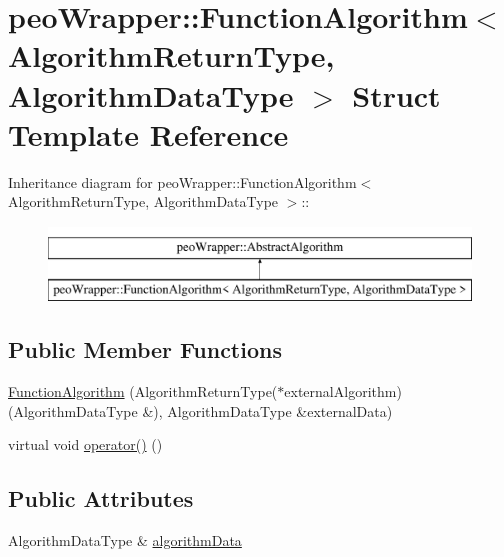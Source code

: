 \hypertarget{structpeoWrapper_1_1FunctionAlgorithm}{
\section{peo\-Wrapper::Function\-Algorithm$<$ Algorithm\-Return\-Type, Algorithm\-Data\-Type $>$ Struct Template Reference}
\label{structpeoWrapper_1_1FunctionAlgorithm}
}
Inheritance diagram for peo\-Wrapper::Function\-Algorithm$<$ Algorithm\-Return\-Type, Algorithm\-Data\-Type $>$::\begin{figure}[H]
\begin{center}
\leavevmode
\includegraphics[height=2cm]{structpeoWrapper_1_1FunctionAlgorithm}
\end{center}
\end{figure}
\subsection*{Public Member Functions}
\begin{CompactItemize}
\item 
\hypertarget{structpeoWrapper_1_1FunctionAlgorithm_9d3994238a3f015dd0b3778ac37f7ea8}{
\hyperlink{structpeoWrapper_1_1FunctionAlgorithm_9d3994238a3f015dd0b3778ac37f7ea8}{Function\-Algorithm} (Algorithm\-Return\-Type($\ast$external\-Algorithm)(Algorithm\-Data\-Type \&), Algorithm\-Data\-Type \&external\-Data)}
\label{structpeoWrapper_1_1FunctionAlgorithm_9d3994238a3f015dd0b3778ac37f7ea8}

\item 
\hypertarget{structpeoWrapper_1_1FunctionAlgorithm_8dcef2d1fcf6147762a2809748ff6170}{
virtual void \hyperlink{structpeoWrapper_1_1FunctionAlgorithm_8dcef2d1fcf6147762a2809748ff6170}{operator()} ()}
\label{structpeoWrapper_1_1FunctionAlgorithm_8dcef2d1fcf6147762a2809748ff6170}

\end{CompactItemize}
\subsection*{Public Attributes}
\begin{CompactItemize}
\item 
\hypertarget{structpeoWrapper_1_1FunctionAlgorithm_2aef841dc81451d1585c930c7880ab09}{
Algorithm\-Data\-Type \& \hyperlink{structpeoWrapper_1_1FunctionAlgorithm_2aef841dc81451d1585c930c7880ab09}{algorithm\-Data}}
\label{structpeoWrapper_1_1FunctionAlgorithm_2aef841dc81451d1585c930c7880ab09}

\end{CompactItemize}


